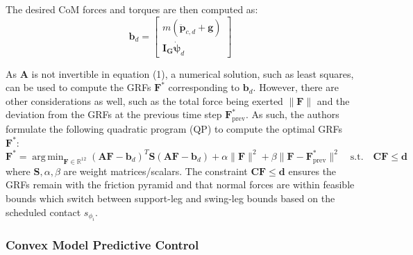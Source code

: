 \documentclass[12pt,a4paper]{article}
\theoremstyle{plain}
\theoremstyle{definition}
\theoremstyle{remark}
\DeclareMathOperator*{\argmin}{arg\,min}
\begin{document}
The desired CoM forces and torques are then computed as:
\[
\mathbf{b}_d =
\begin{bmatrix}
m(\mathbf{\ddot{p}}_{c,d} + \mathbf{g}) \\[4pt]
\mathbf{I_G} \mathbf{\dot{\psi}}_d
\end{bmatrix}
\]

As $\mathbf{A}$ is not invertible in equation (1), a numerical solution, such as least squares, can be used to compute the GRFs $\mathbf{F}^*$ corresponding to $\mathbf{b}_d$. However, there are other considerations as well, such as the total force being exerted $\|\mathbf{F}\|$ and the deviation from the GRFs at the previous time step $\mathbf{F}^*_{\text{prev}}$. As such, the authors formulate the following quadratic program (QP) to compute the optimal GRFs $\mathbf{F}^*$:
\[
\mathbf{F}^* = 
\argmin_{\mathbf{F} \in \mathbb{R}^{12}}
    (\mathbf{A}\mathbf{F} - \mathbf{b}_d)^{T} \mathbf{S} (\mathbf{A}\mathbf{F} - \mathbf{b}_d)
    + \alpha \|\mathbf{F}\|^2 
    + \beta \|\mathbf{F} - \mathbf{F}_{\text{prev}}^*\|^2
\quad
\text{s.t.} \quad
\mathbf{C}\mathbf{F} \leq \mathbf{d}
\]
where $\mathbf{S}, \alpha, \beta$ are weight matrices/scalars. The constraint $\mathbf{C}\mathbf{F} \leq \mathbf{d}$ ensures the GRFs remain with the friction pyramid and that normal forces are within feasible bounds which switch between support-leg and swing-leg bounds based on the scheduled contact $s_{\phi_i}$.

\subsubsection{Convex Model Predictive Control}
\end{document}
